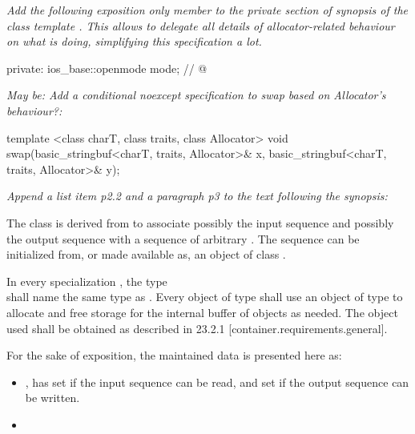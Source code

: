 \documentclass[ebook,11pt,article]{memoir}
\begin{document}
\textit{Add the following exposition only member to the private section of synopsis of the class template . This allows to delegate all details of allocator-related behaviour on what  is doing, simplifying this specification a lot.}
\begin{codeblock}
  private:
    ios_base::openmode mode;  // \expos
    @
\end{codeblock}

\textit{May be: Add a conditional noexcept specification to swap based on Allocator's behaviour?:}
\begin{codeblock}
  template <class charT, class traits, class Allocator>
    void swap(basic_stringbuf<charT, traits, Allocator>& x,
              basic_stringbuf<charT, traits, Allocator>& y);
\end{codeblock}


\textit{Append a list item p2.2 and a paragraph p3 to the text following the synopsis:}

\pnum
The class
is derived from
to associate possibly the input sequence and possibly
the output sequence with a sequence of arbitrary
.
The sequence can be initialized from, or made available as, an object of class
.

\begin{insrt}
\pnum
In every specialization , the type \\ shall name the same type as . 
Every object of type  shall use an object of type  to allocate and free storage for the internal buffer of  objects as needed. The  object used shall be obtained as described in 23.2.1 [container.requirements.general].
\end{insrt}

\pnum
For the sake of exposition, the maintained data is presented here as:
\begin{itemize}
\item
{},
has
set if the input sequence can be read, and
set if the output sequence can be written.
\item
{}
\end{itemize}
\end{document}
